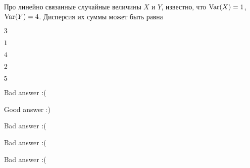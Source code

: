 
\begin{question}
Про линейно связанные случайные величины \(X\) и \(Y\), известно, что
\(\operatorname{Var}(X)=1\), \(\operatorname{Var}(Y)=4\). Дисперсия их суммы может быть равна
\begin{answerlist}
  \item \(3\)
  \item \(1\)
  \item \(4\)
  \item \(2\)
  \item \(5\)
\end{answerlist}
\end{question}

\begin{solution}
\begin{answerlist}
  \item Bad answer :(
  \item Good answer :)
  \item Bad answer :(
  \item Bad answer :(
  \item Bad answer :(
\end{answerlist}
\end{solution}

